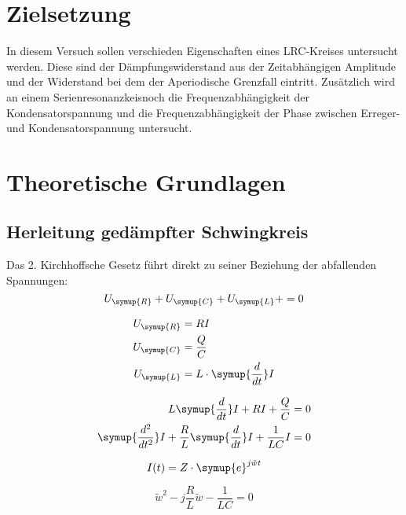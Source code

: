 \section{Zielsetzung}
    In diesem Versuch sollen verschieden Eigenschaften eines LRC-Kreises untersucht werden. Diese sind der Dämpfungswiderstand aus der 
    Zeitabhängigen Amplitude und der Widerstand bei dem der Aperiodische Grenzfall eintritt. Zusätzlich wird an einem 
    Serienresonanzkeisnoch die Frequenzabhängigkeit der Kondensatorspannung und die Frequenzabhängigkeit der Phase zwischen Erreger- und 
    Kondensatorspannung untersucht.

\section{Theoretische Grundlagen}

    \subsection{Herleitung gedämpfter Schwingkreis}

    Das 2. Kirchhoffsche Gesetz führt direkt zu seiner Beziehung der abfallenden Spannungen:
    \begin{equation}
    U_{\symup{R}} + U_{\symup{C}} + U_{\symup{L}} +  = 0     \nonumber
    \end{equation}

    
    \begin{align}
        U_{\symup{R}} & = RI \nonumber\\
        U_{\symup{C}} & = \frac{Q}{C}\nonumber\\
        U_{\symup{L}} & = L \cdot \symup{\frac{d}{dt}}I \nonumber
    \end{align}

    \begin{align}
        L  \symup{\frac{d}{dt}}I + RI + \frac{Q}{C} & = 0 \nonumber\\
        \symup{\frac{d^2}{dt^2}}I + \frac{R}{L} \symup{\frac{d}{dt}}I + \frac{1}{LC}I & = 0 \nonumber
    \end{align}
    
    \begin{equation}
        I(t) = Z \cdot \symup{e}^{j \tilde{w} t} \nonumber
    \end{equation}

    \begin{equation}
        \tilde{w}^2 - j \frac{R}{L}\tilde{w} - \frac{1}{LC} = 0 \nonumber
    \end{equation}

